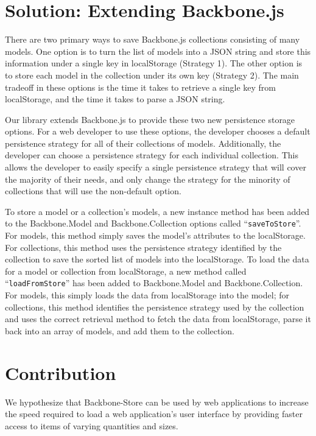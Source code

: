\documentclass[12pt]{article}
\begin{document}
\section{Solution: Extending Backbone.js}

There are two primary ways to save Backbone.js collections consisting of many
models. One option is to turn the list of models into a JSON string and store
this information under a single key in localStorage (Strategy 1). The other option is to
store each model in the collection under its own key (Strategy 2). The main tradeoff in
these options is the time it takes to retrieve a single key from localStorage,
and the time it takes to parse a JSON string.

Our library extends Backbone.js to provide these two new persistence storage
options. For a web developer to use these options, the developer chooses a
default persistence strategy for all of their collections of models.
Additionally, the developer can choose a persistence strategy for each
individual collection. This allows the developer to easily specify a single
persistence strategy that will cover the majority of their needs, and only
change the strategy for the minority of collections that will use the
non-default option.

To store a model or a collection's models, a new instance method has been added
to the Backbone.Model and Backbone.Collection options called
``\verb=saveToStore=''. For models, this method simply saves the model's
attributes to the localStorage. For collections, this method uses the
persistence strategy identified by the collection to save the sorted list of
models into the localStorage. To load the data for a model or collection from
localStorage, a new method called ``\verb=loadFromStore='' has been added to
Backbone.Model and Backbone.Collection. For models, this simply loads the data
from localStorage into the model; for collections, this method identifies the
persistence strategy used by the collection and uses the correct retrieval
method to fetch the data from localStorage, parse it back into an array of
models, and add them to the collection.

\section{Contribution}

We hypothesize that Backbone-Store can be used by web applications to increase the speed required to load a web application's user interface by providing faster access to items of varying quantities and sizes.
\end{document}
